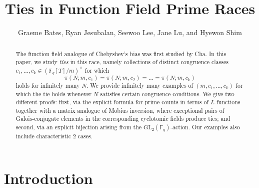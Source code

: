 \documentclass[10pt,reqno]{amsproc}
\newcommand{\GL}{\mathrm{GL}}
\newcommand{\bF}{\mathbb{F}}
\newcommand{\1}{\mathds{1}}	%
\theoremstyle{definition}
\theoremstyle{remark}
\begin{document}

\title{Ties in Function Field Prime Races}


\author{Graeme Bates, Ryan Jesubalan, Seewoo Lee, Jane Lu, and Hyewon Shim}
\date{}


\begin{abstract}
    The function field analogue of Chebyshev's bias was first studied by Cha. In this paper, we study \emph{ties} in this race, namely collections of distinct congruence classes \(c_1, \dots, c_k \in (\bF_q[T] / m)^\times\) for which
    \[
        \pi(N; m, c_1) = \pi(N; m, c_2) = \dots = \pi(N; m, c_k)
    \]
    holds for infinitely many $N$.
    We provide infinitely many examples of \((m, c_1, \dots, c_k)\) for which the tie holds whenever $N$ satisfies certain congruence conditions.
    We give two different proofs: first, via the explicit formula for prime counts in terms of \(L\)-functions together with a matrix analogue of M\"obius inversion, where exceptional pairs of Galois-conjugate elements in the corresponding cyclotomic fields produce ties; and second, via an explicit bijection arising from the \(\GL_2(\bF_q)\)-action.
    Our examples also include characteristic 2 cases.
\end{abstract}


\maketitle

\section{Introduction}
\label{sec:intro}
\end{document}
